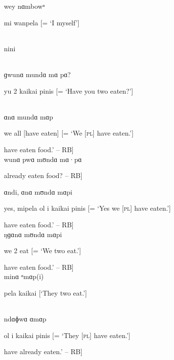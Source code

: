 \noindent wey nɑmbowᵘ

\noindent mi wanpela [= ‘I myself’]

\\

\noindent nini


\noindent [‘two’ -- RB]\\

\noindent ɡwunɑ mundɑ mɑ pɑ?

\noindent yu 2 kaikai pinis [= ‘Have you two eaten?’]

\\

\noindent ɑnɑ mundɑ mɑp

\noindent we all [have eaten] [= ‘We [\textsc{pl}] have eaten.’]

\noindent [‘We [\textsc{pl.excl}] have eaten food.’ -- RB]\\

\noindent wunɑ pwɑ mʊndɑ mɑ·pɑ


\noindent [‘Have you [\textsc{pl.excl}] already eaten food? -- RB]\\

\newpage

\noindent ɑndi, ɑnɑ mʊndɑ mɑpi

\noindent yes, mipela ol i kaikai pinis [= ‘Yes we [\textsc{pl}] have eaten.’]

\noindent [‘Yes, we [\textsc{pl.excl}] have eaten food.’ -- RB]\\

\noindent ŋɡɑnɑ mʊndɑ mɑpi

\noindent we 2 eat [= ‘We two eat.’]

\noindent [‘We [\textsc{du.excl}] have eaten food.’ -- RB]\\

\noindent minɑ ᵅmɑp(i)

 pela kaikai [‘They two eat.’]

\\

\noindent ndɑɸwɑ ɑmɑp

\noindent ol i kaikai pinis [= ‘They [\textsc{pl}] have eaten.’]

\noindent [‘They [\textsc{pl}] have already eaten.’ -- RB]\\


